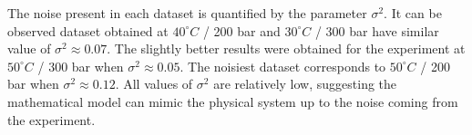 \documentclass[../Article_Model_Parameters.tex]{subfiles}
\begin{document}
	The noise present in each dataset is quantified by the parameter $\sigma^2$. It can be observed dataset obtained at $40 ^\circ C$ / 200 bar and $30 ^\circ C$ / 300 bar have similar value of $\sigma^2\approx0.07$. The slightly better results were obtained for the experiment at $50 ^\circ C$ / 300 bar when $\sigma^2\approx0.05$. The noisiest dataset corresponds to $50 ^\circ C$ / 200 bar when $\sigma^2\approx0.12$. All values of $\sigma^2$ are relatively low, suggesting the mathematical model can mimic the physical system up to the noise coming from the experiment.

		
	

	
	
\end{document}
